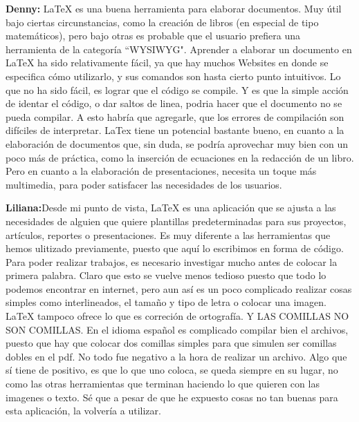 \documentclass[12pt]{report}
\begin{document}
	\textbf{Denny:\newline\newline} LaTeX es una buena herramienta para elaborar documentos. Muy útil bajo ciertas circunstancias, como la creación de libros (en especial de tipo matemáticos), pero bajo otras es probable que el usuario prefiera una herramienta de la categoría ``WYSIWYG".
\newline
\newline
Aprender a elaborar un documento en LaTeX ha sido relativamente fácil, ya que hay muchos Websites en donde se especifica cómo utilizarlo, y sus comandos son hasta cierto punto intuitivos. Lo que no ha sido fácil, es lograr que el código se compile. Y es que la simple acción de identar el código, o dar saltos de linea,  podria hacer que el documento no se pueda compilar. A esto habría que agregarle, que los errores de compilación son difíciles de interpretar. 
\newline
\newline
LaTex tiene un potencial bastante bueno, en cuanto a la elaboración de documentos que, sin duda, se podría aprovechar muy bien con un poco más de práctica, como la inserción de ecuaciones en la redacción de un libro. Pero en cuanto a la elaboración de presentaciones, necesita un toque más multimedia, para poder satisfacer las necesidades de los usuarios.
\newline
\newline


\textbf{Liliana:\newline\newline}Desde mi punto de vista, LaTeX es una aplicación que se ajusta a las necesidades de alguien que quiere plantillas predeterminadas para sus proyectos, artículos, reportes o presentaciones. Es muy diferente a las herramientas que hemos ulitizado previamente, puesto que aquí lo escribimos en forma de código.
\newline
\newline
Para poder realizar trabajos, es necesario investigar mucho antes de colocar la primera palabra. Claro que esto se vuelve menos tedioso puesto que todo lo podemos encontrar en internet, pero aun así es un poco complicado realizar cosas simples como interlineados, el tamaño y tipo de letra o colocar una imagen.
\newline
\newline
LaTeX tampoco ofrece lo que es correción de ortografía. Y LAS COMILLAS NO SON COMILLAS. En el idioma español es complicado compilar bien el archivos, puesto que hay que colocar dos comillas simples para que simulen ser comillas dobles en el pdf.
\newline
\newline
No todo fue negativo a la hora de realizar un archivo. Algo que sí tiene de positivo, es que lo que uno coloca, se queda siempre en su lugar, no como las otras herramientas que terminan haciendo lo que quieren con las imagenes o texto.
\newline
\newline
Sé que a pesar de que he expuesto cosas no tan buenas para esta aplicación, la volvería a utilizar.
\newline
\newline
\end{document}
